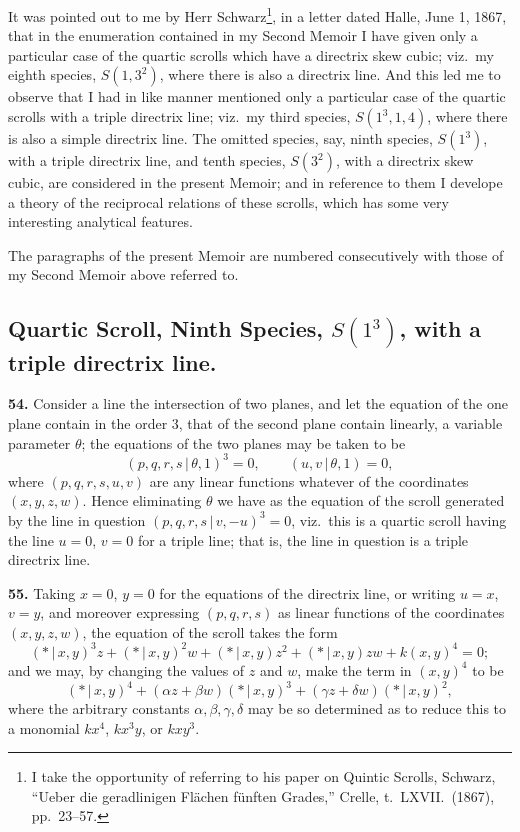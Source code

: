 \documentclass[11pt,a4paper]{article}
\begin{document}
It was pointed out to me by Herr Schwarz\footnote{I take the opportunity of referring to his paper on Quintic Scrolls, Schwarz, ``Ueber die geradlinigen Fl\"achen f\"unften Grades,'' Crelle, t.~LXVII.\ (1867), pp.~23--57.}, in a letter dated Halle, June 1, 1867, that in the enumeration contained in my Second Memoir I have given only a particular case of the quartic scrolls which have a directrix skew cubic; viz.\ my eighth species, $S(1, 3^2)$, where there is also a directrix line. And this led me to observe that I had in like manner mentioned only a particular case of the quartic scrolls with a triple directrix line; viz.\ my third species, $S(1^3, 1, 4)$, where there is also a simple directrix line. The omitted species, say, ninth species, $S(1^3)$, with a triple directrix line, and tenth species, $S(3^2)$, with a directrix skew cubic, are considered in the present Memoir; and in reference to them I develope a theory of the reciprocal relations of these scrolls, which has some very interesting analytical features.

The paragraphs of the present Memoir are numbered consecutively with those of my Second Memoir above referred to.

\subsection*{Quartic Scroll, Ninth Species, $S(1^3)$, with a triple directrix line.}

\textbf{54.} Consider a line the intersection of two planes, and let the equation of the one plane contain in the order 3, that of the second plane contain linearly, a variable parameter $\theta$; the equations of the two planes may be taken to be
\[
(p, q, r, s \,\vert\, \theta, 1)^3 = 0, \qquad (u, v \,\vert\, \theta, 1) = 0,
\]
where $(p, q, r, s, u, v)$ are any linear functions whatever of the coordinates $(x, y, z, w)$. Hence eliminating $\theta$ we have as the equation of the scroll generated by the line in question $(p, q, r, s \,\vert\, v, -u)^3 = 0$, viz.\ this is a quartic scroll having the line $u=0$, $v=0$ for a triple line; that is, the line in question is a triple directrix line.

\textbf{55.} Taking $x=0$, $y=0$ for the equations of the directrix line, or writing $u=x$, $v=y$, and moreover expressing $(p, q, r, s)$ as linear functions of the coordinates $(x, y, z, w)$, the equation of the scroll takes the form
\[
(* \,\vert\, x, y)^3 z + (* \,\vert\, x, y)^2 w + (* \,\vert\, x, y) z^2 + (* \,\vert\, x, y) zw + k(x, y)^4 = 0;
\]
and we may, by changing the values of $z$ and $w$, make the term in $(x, y)^4$ to be
\[
(* \,\vert\, x, y)^4 + (\alpha z + \beta w)(* \,\vert\, x, y)^3 + (\gamma z + \delta w)(* \,\vert\, x, y)^2,
\]
where the arbitrary constants $\alpha, \beta, \gamma, \delta$ may be so determined as to reduce this to a monomial $kx^4$, $kx^3y$, or $kxy^3$.
\end{document}
